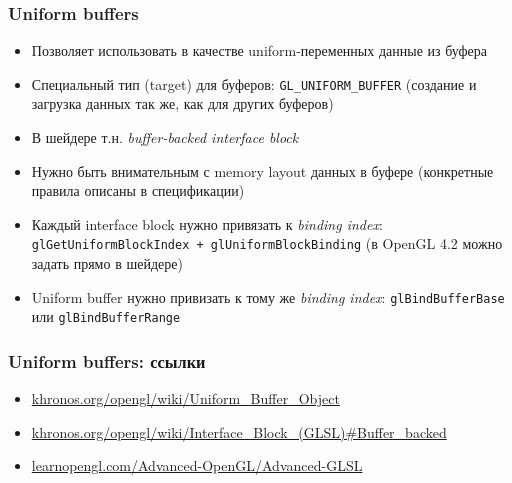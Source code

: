 \documentclass{beamer}
\begin{document}
\begin{frame}[fragile]
\frametitle{Uniform buffers}
\begin{itemize}
\item Позволяет использовать в качестве uniform-переменных данные из буфера
\pause
\item Специальный тип (target) для буферов: \verb|GL_UNIFORM_BUFFER| (создание и загрузка данных \textendash{} так же, как для других буферов)
\pause
\item В шейдере \textendash{} т.н. \textit{buffer-backed interface block}
\pause
\item Нужно быть внимательным с memory layout данных в буфере (конкретные правила описаны в спецификации)
\pause
\item Каждый interface block нужно привязать к \textit{binding index}: \verb|glGetUniformBlockIndex + glUniformBlockBinding| (в OpenGL 4.2 можно задать прямо в шейдере)
\item Uniform buffer нужно привизать к тому же \textit{binding index}: \verb|glBindBufferBase| или \verb|glBindBufferRange|
\end{itemize}
\end{frame}

\begin{frame}[fragile]
\fontsize{10pt}{10pt}
\frametitle{Uniform buffers: ссылки}
\begin{itemize}
\item \href{https://www.khronos.org/opengl/wiki/Uniform_Buffer_Object}{khronos.org/opengl/wiki/Uniform\_Buffer\_Object}
\item \href{https://www.khronos.org/opengl/wiki/Interface_Block_(GLSL)#Buffer_backed}{khronos.org/opengl/wiki/Interface\_Block\_(GLSL)\#Buffer\_backed}
\item \href{https://learnopengl.com/Advanced-OpenGL/Advanced-GLSL}{learnopengl.com/Advanced-OpenGL/Advanced-GLSL}
\end{itemize}
\end{frame}
\end{document}

